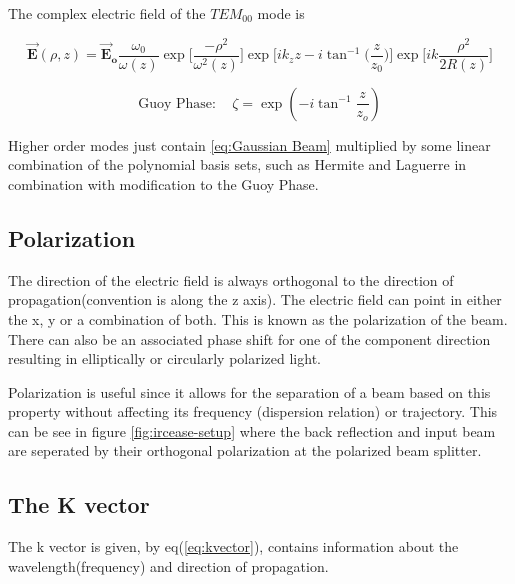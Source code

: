 \documentclass[11pt,a4paper]{book}
\begin{document}
			The complex electric field of the $TEM_{00}$ mode is 
			
			\begin{equation}
				\label {eq:Gaussian Beam}
				\vec{\textbf{E}}(\rho,z)=\vec{\textbf{E}}_\textbf{o}\frac{\omega_{0}}{\omega(z)} \exp\bigg[\dfrac{-\rho^2}{\omega^2(z)}\bigg] \exp\bigg[ik_z z - i \tan^{-1}\bigg(\frac{z}{z_0}\bigg)\bigg]\exp\bigg[ik \dfrac{\rho^2}{2R(z)}\bigg]
			\end{equation}
			
			\begin{equation}
				\label {eq:Guoy Phase}
				\text{Guoy Phase}:\quad \zeta = \exp\left(-i\tan^{-1}{\dfrac{z}{z_o}}\right)
			\end{equation}
			
			\noindent
			Higher order modes just contain \autoref{eq:Gaussian Beam} multiplied by some linear combination of the polynomial basis sets, such as Hermite and Laguerre in combination with modification to the Guoy Phase.
		
		\subsection{Polarization}
			\label{subsec:Polarization}
			The direction of the electric field is always orthogonal to the direction of propagation(convention is along the z axis). The electric field can point in either the x, y or a combination of both. This is known as the polarization of the beam. There can also be an associated phase shift for one of the component direction resulting in elliptically or circularly polarized light.
			
			Polarization is useful since it allows for the separation of a beam based on this property without affecting its frequency (dispersion relation) or trajectory. This can be see in figure \autoref{fig:ircease-setup}
	 where the back reflection and input beam are seperated by their orthogonal polarization at the polarized beam splitter.
			
		\subsection{The K vector}
			\label{subsec:The K vector}
			The k vector is given, by eq(\autoref{eq:kvector}), contains information about the wavelength(frequency) and direction of propagation.
			
\end{document}
